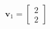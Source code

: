 \documentclass[preview]{standalone}
\begin{document}
\begin{align*}
\mathbf{v}_1=\begin{bmatrix} 2 \\ 2 \end{bmatrix}
\end{align*}
\end{document}
